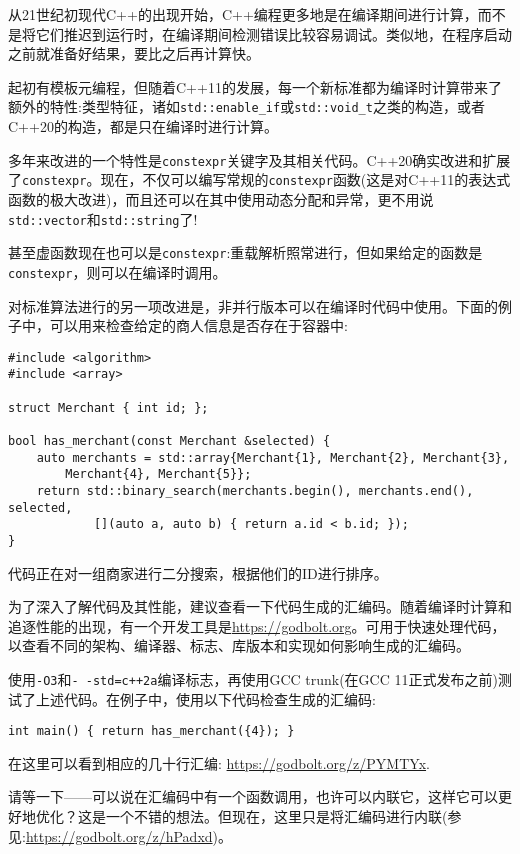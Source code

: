 
从21世纪初现代C++的出现开始，C++编程更多地是在编译期间进行计算，而不是将它们推迟到运行时，在编译期间检测错误比较容易调试。类似地，在程序启动之前就准备好结果，要比之后再计算快。

起初有模板元编程，但随着C++11的发展，每一个新标准都为编译时计算带来了额外的特性:类型特征，诸如\texttt{std::enable\_if}或\texttt{std::void\_t}之类的构造，或者C++20的构造，都是只在编译时进行计算。

多年来改进的一个特性是\texttt{constexpr}关键字及其相关代码。C++20确实改进和扩展了\texttt{constexpr}。现在，不仅可以编写常规的\texttt{constexpr}函数(这是对C++11的表达式函数的极大改进)，而且还可以在其中使用动态分配和异常，更不用说\texttt{std::vector}和\texttt{std::string}了!

甚至虚函数现在也可以是\texttt{constexpr}:重载解析照常进行，但如果给定的函数是\texttt{constexpr}，则可以在编译时调用。

对标准算法进行的另一项改进是，非并行版本可以在编译时代码中使用。下面的例子中，可以用来检查给定的商人信息是否存在于容器中:

\begin{lstlisting}[style=styleCXX]
#include <algorithm>
#include <array>

struct Merchant { int id; };

bool has_merchant(const Merchant &selected) {
	auto merchants = std::array{Merchant{1}, Merchant{2}, Merchant{3},
		Merchant{4}, Merchant{5}};
	return std::binary_search(merchants.begin(), merchants.end(), selected,
			[](auto a, auto b) { return a.id < b.id; });
}
\end{lstlisting}

代码正在对一组商家进行二分搜索，根据他们的ID进行排序。

为了深入了解代码及其性能，建议查看一下代码生成的汇编码。随着编译时计算和追逐性能的出现，有一个开发工具是\url{https://godbolt.org}。可用于快速处理代码，以查看不同的架构、编译器、标志、库版本和实现如何影响生成的汇编码。

使用\texttt{-O3}和\texttt{-\,-std=c++2a}编译标志，再使用GCC trunk(在GCC 11正式发布之前)测试了上述代码。在例子中，使用以下代码检查生成的汇编码:

\begin{lstlisting}[style=styleCXX]
int main() { return has_merchant({4}); }
\end{lstlisting}

在这里可以看到相应的几十行汇编: \url{https://godbolt.org/z/PYMTYx}.

请等一下——可以说在汇编码中有一个函数调用，也许可以内联它，这样它可以更好地优化？这是一个不错的想法。但现在，这里只是将汇编码进行内联(参见:\url{https://godbolt.org/z/hPadxd})。


